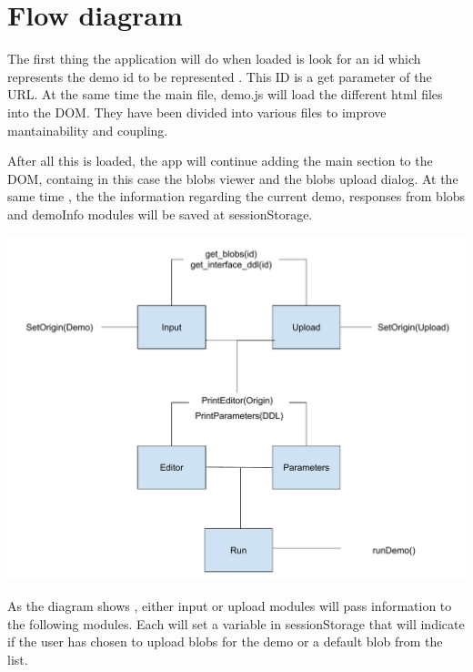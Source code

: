 
\section{Flow diagram}
The first thing the application will do when loaded is look for an id which  represents
the demo id to be represented . This ID is a get parameter of the URL.
At the same time  the main file, demo.js will load the different html files into the DOM. They have been divided into various  files to improve mantainability and coupling.

After all this  is loaded, the app will continue adding the main section to the DOM,
 containg in this case the blobs viewer and the blobs upload dialog. At the same time , the 
 the information regarding the current demo, responses from  blobs   and demoInfo modules 
 will be saved at  sessionStorage.
 
\includegraphics[width=\textwidth]{images/flow}

As the diagram shows , either input or upload modules will pass information to the following modules. Each will set a variable in sessionStorage 
that will indicate if the user has chosen to upload blobs for the demo or a default blob from the list. 

